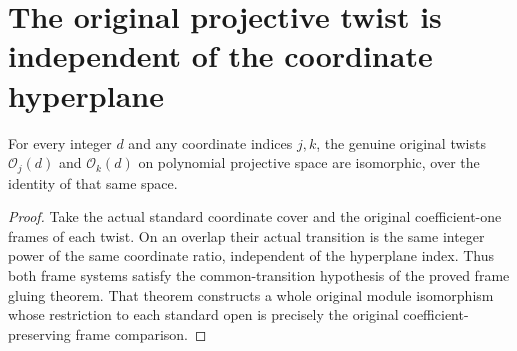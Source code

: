 \section{The original projective twist is independent of the coordinate hyperplane}

\begin{lemma}
\label{lem:coherent-projective-coordinate-twist-independence}
\leanok
For every integer $d$ and any coordinate indices $j,k$, the genuine
original twists $\mathcal O_j(d)$ and $\mathcal O_k(d)$ on polynomial
projective space are isomorphic, over the identity of that same space.
\end{lemma}
\begin{proof}
Take the actual standard coordinate cover and the original
coefficient-one frames of each twist. On an overlap their actual
transition is the same integer power of the same coordinate ratio,
independent of the hyperplane index. Thus both frame systems satisfy
the common-transition hypothesis of the proved frame gluing theorem.
That theorem constructs a whole original module isomorphism whose
restriction to each standard open is precisely the original
coefficient-preserving frame comparison.
\end{proof}
